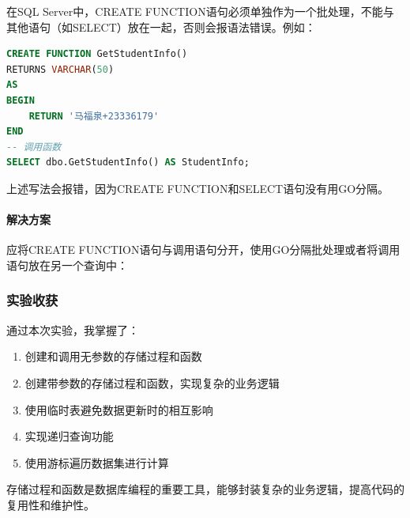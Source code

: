 \documentclass[a4paper]{article}
\begin{document}
在SQL Server中，CREATE FUNCTION语句必须单独作为一个批处理，不能与其他语句（如SELECT）放在一起，否则会报语法错误。例如：

\begin{lstlisting}[language=SQL]
CREATE FUNCTION GetStudentInfo()
RETURNS VARCHAR(50)
AS
BEGIN
    RETURN '马福泉+23336179'
END
-- 调用函数
SELECT dbo.GetStudentInfo() AS StudentInfo;
\end{lstlisting}
上述写法会报错，因为CREATE FUNCTION和SELECT语句没有用GO分隔。
\paragraph{解决方案}
应将CREATE FUNCTION语句与调用语句分开，使用GO分隔批处理或者将调用语句放在另一个查询中：

\subsubsection{实验收获}

通过本次实验，我掌握了：
\begin{enumerate}
    \item 创建和调用无参数的存储过程和函数
    \item 创建带参数的存储过程和函数，实现复杂的业务逻辑
    \item 使用临时表避免数据更新时的相互影响
    \item 实现递归查询功能
    \item 使用游标遍历数据集进行计算
\end{enumerate}

存储过程和函数是数据库编程的重要工具，能够封装复杂的业务逻辑，提高代码的复用性和维护性。
\end{document}
